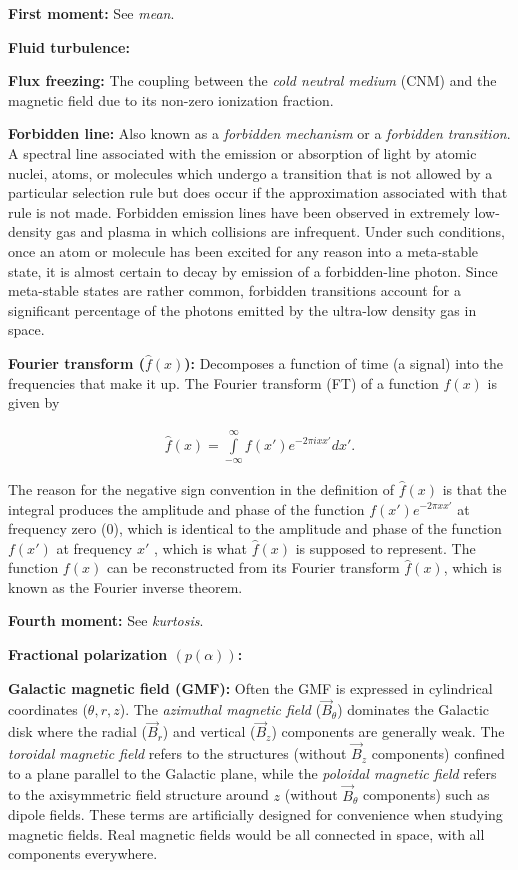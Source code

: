 \documentclass[a4paper,10pt]{article}
\begin{document}
{\noindent}\textbf{First moment:} See \textit{mean}.

{\noindent}\textbf{Fluid turbulence:}

{\noindent}\textbf{Flux freezing:} The coupling between the \textit{cold neutral medium} (CNM) and the magnetic field due to its non-zero ionization fraction.

{\noindent}\textbf{Forbidden line:} Also known as a \textit{forbidden mechanism} or a \textit{forbidden transition}. A spectral line associated with the emission or absorption of light by atomic nuclei, atoms, or molecules which undergo a transition that is not allowed by a particular selection rule but does occur if the approximation associated with that rule is not made. Forbidden emission lines have been observed in extremely low-density gas and plasma in which collisions are infrequent. Under such conditions, once an atom or molecule has been excited for any reason into a meta-stable state, it is almost certain to decay by emission of a forbidden-line photon. Since meta-stable states are rather common, forbidden transitions account for a significant percentage of the photons emitted by the ultra-low density gas in space.

{\noindent}\textbf{Fourier transform ($\hat{f}(x)$):} Decomposes a function of time (a signal) into the frequencies that make it up. The Fourier transform (FT) of a function $f(x)$ is given by

\begin{align*}
    \hat{f}(x) = \int\limits_{-\infty}^\infty f(x')e^{-2\pi ixx'}dx'.
\end{align*}

{\noindent}The reason for the negative sign convention in the definition of $\hat{f}(x)$ is that the integral produces the amplitude and phase of the function $f(x')e^{-2\pi xx'}$ at frequency zero ($0$), which is identical to the amplitude and phase of the function $f(x')$ at frequency $x'$ , which is what $\hat{f}(x)$ is supposed to represent. The function $f(x)$ can be reconstructed from its Fourier transform $\hat{f}(x)$, which is known as the Fourier inverse theorem.

{\noindent}\textbf{Fourth moment:} See \textit{kurtosis}.

{\noindent}\textbf{Fractional polarization $(p(\alpha))$:}

{\noindent}\textbf{Galactic magnetic field (GMF):} Often the GMF is expressed in cylindrical coordinates ($\theta, r, z$). The \textit{azimuthal magnetic field} ($\vec{B}_\theta$) dominates the Galactic disk where the radial ($\vec{B}_r$) and vertical ($\vec{B}_z$) components are generally weak. The \textit{toroidal magnetic field} refers to the structures (without $\vec{B}_z$ components) confined to a plane parallel to the Galactic plane, while the \textit{poloidal magnetic field} refers to the axisymmetric field structure around $z$ (without $\vec{B}_\theta$ components) such as dipole fields. These terms are artificially designed for convenience when studying magnetic fields. Real magnetic fields would be all connected in space, with all components everywhere.
\end{document}
